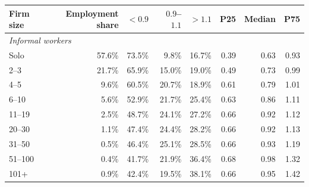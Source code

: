 \begin{tabular}{lrrrrrrr}
\toprule
    Firm size & Employment share & $<0.9$ & $0.9$--$1.1$ & $>1.1$ & P25 & Median & P75 \\
    \midrule
\multicolumn{8}{l}{\textit{Informal workers}} \\
Solo & 57.6\% & 73.5\% & 9.8\% & 16.7\% & 0.39 & 0.63 & 0.93 \\
2--3 & 21.7\% & 65.9\% & 15.0\% & 19.0\% & 0.49 & 0.73 & 0.99 \\
4--5 & 9.6\% & 60.5\% & 20.7\% & 18.9\% & 0.61 & 0.79 & 1.01 \\
6--10 & 5.6\% & 52.9\% & 21.7\% & 25.4\% & 0.63 & 0.86 & 1.11 \\
11--19 & 2.5\% & 48.7\% & 24.1\% & 27.2\% & 0.66 & 0.92 & 1.12 \\
20--30 & 1.1\% & 47.4\% & 24.4\% & 28.2\% & 0.66 & 0.92 & 1.13 \\
31--50 & 0.5\% & 46.4\% & 25.1\% & 28.5\% & 0.66 & 0.93 & 1.19 \\
51--100 & 0.4\% & 41.7\% & 21.9\% & 36.4\% & 0.68 & 0.98 & 1.32 \\
101+ & 0.9\% & 42.4\% & 19.5\% & 38.1\% & 0.66 & 0.95 & 1.42\\
\bottomrule\end{tabular}
